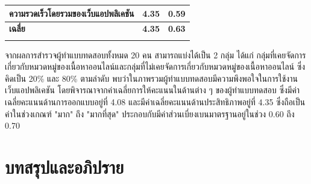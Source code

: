 \documentclass[12pt,oneside,openright,a4paper]{cpe-thai-project}
\begin{document}
\begin{itemize}
\begin{enumerate}
\begin{longtable}{lcc}
        ความรวดเร็วโดยรวมของเว็บแอปพลิเคชัน                             & 4.35       & 0.59          \\ \hline
        \textbf{เฉลี่ย}                                              & \textbf{4.35}        & \textbf{0.63}     \\ \hhline{===}    
      \end{longtable}
      \hspace{1cm}จากผลการสำรวจผู้ทำแบบทดสอบทั้งหมด 20 คน สามารถแบ่งได้เป็น 2 กลุ่ม ได้แก่ 
      กลุ่มที่เคยจัดการเกี่ยวกับหมวดหมู่ของเนื้อหาออนไลน์และกลุ่มที่ไม่เคยจัดการเกี่ยวกับหมวดหมู่ของเนื้อหาออนไลน์
      ซึ่งคิดเป็น 20\% และ 80\% ตามลำดับ พบว่าในภาพรวมผู้ทำแบบทดสอบมีความพึงพอใจในการใช้งานเว็บแอปพลิเคชัน
      โดยพิจารณาจากค่าเฉลี่ยการให้คะแนนในด้านต่าง ๆ ของผู้ทำแบบทดสอบ ซึ่งมีค่าเฉลี่ยคะแนนด้านการออกแบบอยู่ที่ 4.08
      และมีค่าเฉลี่ยคะแนนด้านประสิทธิภาพอยู่ที่ 4.35 ซึ่งถือเป็นค่าในช่วงเกณฑ์ "มาก" ถึง "มากที่สุด" 
      ประกอบกับมีค่าส่วนเบี่ยงเบนมาตรฐานอยู่ในช่วง 0.60 ถึง 0.70


\chapter{บทสรุปและอภิปราย}



\end{enumerate}
\end{itemize}
\end{document}
